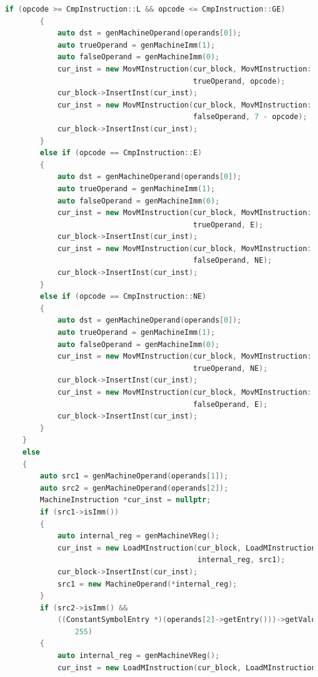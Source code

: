 \documentclass[UTF8,a4paper,10pt]{ctexart}
\begin{document}
\begin{lstlisting}[title = 生成目标代码, language = c++]
        if (opcode >= CmpInstruction::L && opcode <= CmpInstruction::GE)
        {
            auto dst = genMachineOperand(operands[0]);
            auto trueOperand = genMachineImm(1);
            auto falseOperand = genMachineImm(0);
            cur_inst = new MovMInstruction(cur_block, MovMInstruction::MOV, dst,
                                           trueOperand, opcode);
            cur_block->InsertInst(cur_inst);
            cur_inst = new MovMInstruction(cur_block, MovMInstruction::MOV, dst,
                                           falseOperand, 7 - opcode);
            cur_block->InsertInst(cur_inst);
        }
        else if (opcode == CmpInstruction::E)
        {
            auto dst = genMachineOperand(operands[0]);
            auto trueOperand = genMachineImm(1);
            auto falseOperand = genMachineImm(0);
            cur_inst = new MovMInstruction(cur_block, MovMInstruction::MOV, dst,
                                           trueOperand, E);
            cur_block->InsertInst(cur_inst);
            cur_inst = new MovMInstruction(cur_block, MovMInstruction::MOV, dst,
                                           falseOperand, NE);
            cur_block->InsertInst(cur_inst);
        }
        else if (opcode == CmpInstruction::NE)
        {
            auto dst = genMachineOperand(operands[0]);
            auto trueOperand = genMachineImm(1);
            auto falseOperand = genMachineImm(0);
            cur_inst = new MovMInstruction(cur_block, MovMInstruction::MOV, dst,
                                           trueOperand, NE);
            cur_block->InsertInst(cur_inst);
            cur_inst = new MovMInstruction(cur_block, MovMInstruction::MOV, dst,
                                           falseOperand, E);
            cur_block->InsertInst(cur_inst);
        }
    }
    else
    {
        auto src1 = genMachineOperand(operands[1]);
        auto src2 = genMachineOperand(operands[2]);
        MachineInstruction *cur_inst = nullptr;
        if (src1->isImm())
        {
            auto internal_reg = genMachineVReg();
            cur_inst = new LoadMInstruction(cur_block, LoadMInstruction::LDR,
                                            internal_reg, src1);
            cur_block->InsertInst(cur_inst);
            src1 = new MachineOperand(*internal_reg);
        }
        if (src2->isImm() &&
            ((ConstantSymbolEntry *)(operands[2]->getEntry()))->getValue() >
                255)
        {
            auto internal_reg = genMachineVReg();
            cur_inst = new LoadMInstruction(cur_block, LoadMInstruction::LDR,

\end{lstlisting}
\end{document}

